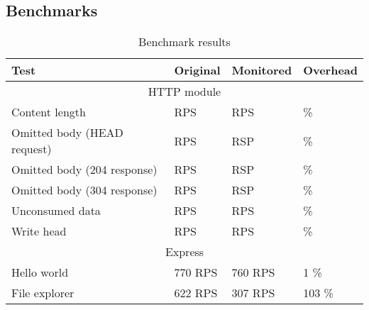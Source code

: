 
\subsection{Benchmarks}

\begin{table}[ht]
  \begin{tabular}{|l|l|l|l|}
    \hline
    \textbf{Test} & 
    \textbf{Original} &
    \textbf{Monitored} &
    \textbf{Overhead} \\
    \hline
    \multicolumn{4}{|c|}{HTTP module}\\
    \hline
    Content length & 
    RPS &
    RPS &
    \% \\

    Omitted body (HEAD request)&
    RPS &
    RSP &
    \% \\

    Omitted body (204 response)&
    RPS &
    RSP &
    \% \\

    Omitted body (304 response)&
    RPS &
    RSP &
    \% \\

    Unconsumed data &
    RPS &
    RPS &
    \% \\
    \hline

    Write head &
    RPS &
    RPS &
    \% \\
    \hline

    \multicolumn{4}{|c|}{Express}\\
    \hline
    Hello world & 
    770 RPS &
    760 RPS &
    1 \% \\

    File explorer &
    622 RPS &
    307 RPS &
    103 \%\\

    \hline
  \end{tabular}
  \caption{Benchmark results}
  \label{table}
\end{table}
